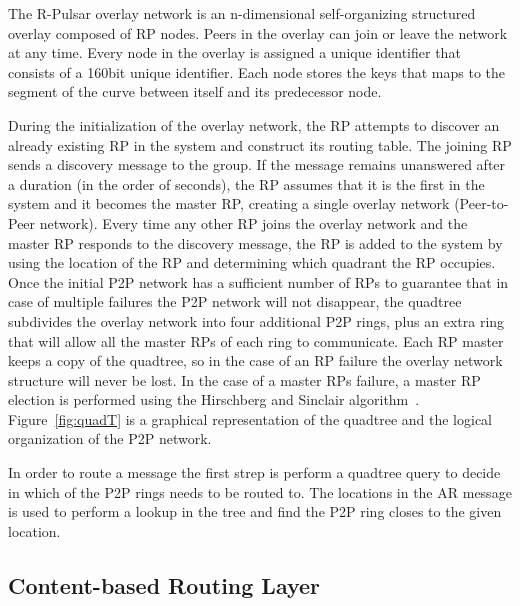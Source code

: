 
The R-Pulsar overlay network is an n-dimensional self-organizing structured overlay composed of RP nodes. Peers in the overlay can join or leave the network at any time. Every node in the overlay is assigned a unique identifier that consists of a 160bit unique identifier. Each node stores the keys that maps to the segment of the curve between itself and its predecessor node.

During the initialization of the overlay network, the RP attempts to discover an already existing RP in the system and construct its routing table. The joining RP sends a discovery message to the group. If the message remains unanswered after a duration (in the order of seconds), the RP assumes that it is the first in the system and it becomes the master RP, creating a single overlay network (Peer-to-Peer network). Every time any other RP joins the overlay network and the master RP responds to the discovery message, the  RP is added to the system by using the location of the RP and determining which quadrant the RP occupies. Once the initial P2P network has a sufficient number of RPs to guarantee that in case of multiple failures the P2P network will not disappear, the quadtree subdivides the overlay network into four additional P2P rings, plus an extra ring that will allow all the master RPs of each ring to communicate. Each RP master keeps a copy of the quadtree, so in the case of an RP failure the overlay network structure will never be lost. In the case of a master RPs failure, a master RP election is performed using the Hirschberg and Sinclair algorithm~\cite{Hirschberg}. Figure~\ref{fig:quadT} is a graphical representation of the quadtree and the logical organization of the P2P network.

In order to route a message the first strep is perform a quadtree query to decide in which of the P2P rings needs to be routed to. The locations in the AR message is used to perform a lookup in the tree and find the P2P ring closes to the given location. 

\subsection{Content-based Routing Layer}\label{sec:frameworkc}

